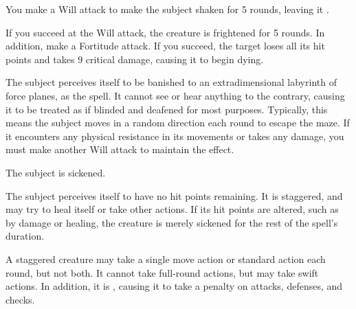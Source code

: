 \spelleffect You make a Will attack to make the subject shaken for 5 rounds, leaving it \vulnerable.
\begin{spellblood}
    If you succeed at the Will attack, the creature is frightened for 5 rounds. In addition, make a Fortitude attack. If you succeed, the target loses all its hit points and takes 9 critical damage, causing it to begin dying.
\end{spellblood}

\spelldur{\durmed}
\spelleffect The subject perceives itself to be banished to an extradimensional labyrinth of force planes, as the  spell. It cannot see or hear anything to the contrary, causing it to be treated as if blinded and deafened for most purposes. Typically, this means the subject moves in a random direction each round to escape the maze. If it encounters any physical resistance in its movements or takes any damage, you must make another Will attack to maintain the effect.

\spelldur{\durshort}
\begin{spellhealthy}
    The subject is sickened.
\end{spellhealthy}
\begin{spellblood}
    The subject perceives itself to have no hit points remaining. It is staggered, and may try to heal itself or take other actions. If its hit points are altered, such as by damage or healing, the creature is merely sickened for the rest of the spell's duration.
\end{spellblood}
\spellnotes A staggered creature may take a single move action or standard action each round, but not both. It cannot take full-round actions, but may take swift actions. In addition, it is \vulnerable, causing it to take a  penalty on attacks, defenses, and checks.

